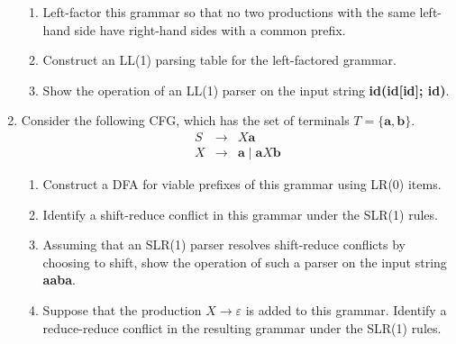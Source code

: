 \documentclass[11pt]{article}
\begin{document}
\begin{enumerate}
\begin{enumerate}

\item Left-factor this grammar so that no two productions with the
same left-hand side have right-hand sides with a common prefix.

\item Construct an LL(1) parsing table for the left-factored grammar.

\item Show the operation of an LL(1) parser on the input string
\textbf{id(id[id]; id)}.

\end{enumerate}

\item Consider the following CFG, which has the set of terminals
$T = \{ \textbf{a}, \textbf{b} \}$.
\begin{eqnarray*}
S & \rightarrow & X \textbf{a} \\
X & \rightarrow & \textbf{a} \mid \textbf{a} X \textbf{b}
\end{eqnarray*}

\begin{enumerate}

\item Construct a DFA for viable prefixes of this grammar using LR(0)
items.

\item Identify a shift-reduce conflict in this grammar under the
SLR(1) rules.

\item Assuming that an SLR(1) parser resolves shift-reduce conflicts
by choosing to shift, show the operation of such a parser on the input
string \textbf{aaba}.

\item Suppose that the production $X \rightarrow \varepsilon$ is added
to this grammar.  Identify a reduce-reduce conflict in the resulting
grammar under the SLR(1) rules.

\end{enumerate}

\end{enumerate}
\end{document}
